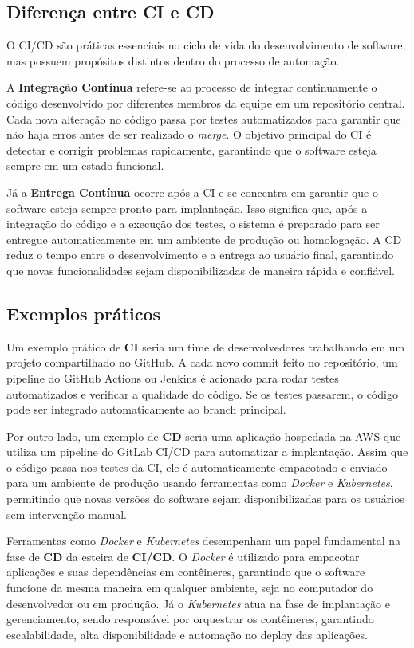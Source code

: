 \documentclass[a4paper,12pt]{article}
\begin{document}
\subsection*{Diferença entre CI e CD}
O CI/CD são práticas essenciais no ciclo de vida do desenvolvimento de software, mas possuem propósitos distintos dentro do processo de automação.  

A \textbf{Integração Contínua } refere-se ao processo de integrar continuamente o código desenvolvido por diferentes membros da equipe em um repositório central. Cada nova alteração no código passa por testes automatizados para garantir que não haja erros antes de ser realizado o \textit{merge}. O objetivo principal do CI é detectar e corrigir problemas rapidamente, garantindo que o software esteja sempre em um estado funcional.  

Já a \textbf{Entrega Contínua} ocorre após a CI e se concentra em garantir que o software esteja sempre pronto para implantação. Isso significa que, após a integração do código e a execução dos testes, o sistema é preparado para ser entregue automaticamente em um ambiente de produção ou homologação. A CD reduz o tempo entre o desenvolvimento e a entrega ao usuário final, garantindo que novas funcionalidades sejam disponibilizadas de maneira rápida e confiável.  

\subsection*{Exemplos práticos}  
Um exemplo prático de \textbf{CI} seria um time de desenvolvedores trabalhando em um projeto compartilhado no GitHub. A cada novo commit feito no repositório, um pipeline do GitHub Actions ou Jenkins é acionado para rodar testes automatizados e verificar a qualidade do código. Se os testes passarem, o código pode ser integrado automaticamente ao branch principal.  

Por outro lado, um exemplo de \textbf{CD} seria uma aplicação hospedada na AWS que utiliza um pipeline do GitLab CI/CD para automatizar a implantação. Assim que o código passa nos testes da CI, ele é automaticamente empacotado e enviado para um ambiente de produção usando ferramentas como \textit{Docker} e \textit{Kubernetes}, permitindo que novas versões do software sejam disponibilizadas para os usuários sem intervenção manual.  

Ferramentas como \textit{Docker} e \textit{Kubernetes} desempenham um papel fundamental na fase de \textbf{CD} da esteira de \textbf{CI/CD}. O \textit{Docker} é utilizado para empacotar aplicações e suas dependências em contêineres, garantindo que o software funcione da mesma maneira em qualquer ambiente, seja no computador do desenvolvedor ou em produção. Já o \textit{Kubernetes} atua na fase de implantação e gerenciamento, sendo responsável por orquestrar os contêineres, garantindo escalabilidade, alta disponibilidade e automação no deploy das aplicações.  
\end{document}
